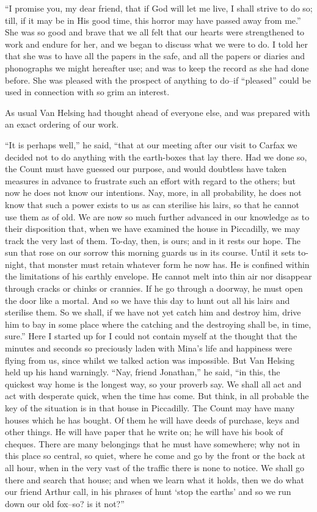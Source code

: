 \documentclass[12pt,openright]{book}
\begin{document}
“I promise you, my dear friend, that if God will let me live, I shall strive to do so; till, if it may be in His good time, this horror may have passed away from me.” She was so good and brave that we all felt that our hearts were strengthened to work and endure for her, and we began to discuss what we were to do. I told her that she was to have all the papers in the safe, and all the papers or diaries and phonographs we might hereafter use; and was to keep the record as she had done before. She was pleased with the prospect of anything to do–if “pleased” could be used in connection with so grim an interest.

As usual Van Helsing had thought ahead of everyone else, and was prepared with an exact ordering of our work.

“It is perhaps well,” he said, “that at our meeting after our visit to Carfax we decided not to do anything with the earth-boxes that lay there. Had we done so, the Count must have guessed our purpose, and would doubtless have taken measures in advance to frustrate such an effort with regard to the others; but now he does not know our intentions. Nay, more, in all probability, he does not know that such a power exists to us as can sterilise his lairs, so that he cannot use them as of old. We are now so much further advanced in our knowledge as to their disposition that, when we have examined the house in Piccadilly, we may track the very last of them. To-day, then, is ours; and in it rests our hope. The sun that rose on our sorrow this morning guards us in its course. Until it sets to-night, that monster must retain whatever form he now has. He is confined within the limitations of his earthly envelope. He cannot melt into thin air nor disappear through cracks or chinks or crannies. If he go through a doorway, he must open the door like a mortal. And so we have this day to hunt out all his lairs and sterilise them. So we shall, if we have not yet catch him and destroy him, drive him to bay in some place where the catching and the destroying shall be, in time, sure.” Here I started up for I could not contain myself at the thought that the minutes and seconds so preciously laden with Mina’s life and happiness were flying from us, since whilst we talked action was impossible. But Van Helsing held up his hand warningly. “Nay, friend Jonathan,” he said, “in this, the quickest way home is the longest way, so your proverb say. We shall all act and act with desperate quick, when the time has come. But think, in all probable the key of the situation is in that house in Piccadilly. The Count may have many houses which he has bought. Of them he will have deeds of purchase, keys and other things. He will have paper that he write on; he will have his book of cheques. There are many belongings that he must have somewhere; why not in this place so central, so quiet, where he come and go by the front or the back at all hour, when in the very vast of the traffic there is none to notice. We shall go there and search that house; and when we learn what it holds, then we do what our friend Arthur call, in his phrases of hunt ‘stop the earths’ and so we run down our old fox–so? is it not?”
\end{document}
